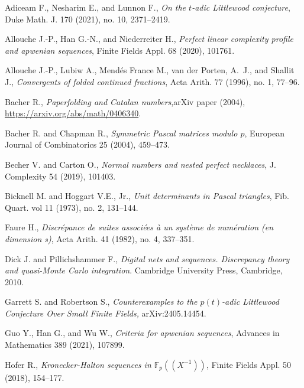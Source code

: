 \documentclass{article}
\newcommand{\FF}{\mathbb F}
\begin{document}
\begin{thebibliography}{99}

 Adiceam F., Nesharim E., and Lunnon F., \textit{On the $t$-adic Littlewood conjecture}, Duke Math. J. 170 (2021), no. 10, 2371--2419.

 Allouche J.-P., Han G.-N., and Niederreiter H., \textit{Perfect linear complexity profile and apwenian sequences}, Finite Fields Appl. 68 (2020), 101761. 

 Allouche J.-P., Lubiw A., Mend\'{e}s France M., van der Porten, A.~J., and Shallit J., \textit{Convergents of folded continued fractions}, Acta Arith. 77 (1996), no. 1, 77--96.

 Bacher R., \textit{Paperfolding and Catalan numbers},arXiv paper (2004), \url{https://arxiv.org/abs/math/0406340}. 

 Bacher R. and Chapman R., \textit{Symmetric Pascal matrices modulo $p$}, European Journal of Combinatorics 25 (2004), 459--473. 


 Becher V. and Carton O., \textit{Normal numbers and nested perfect necklaces}, J. Complexity 54 (2019), 101403.

 Bicknell M. and Hoggart V.E., Jr., \textit{Unit determinants in Pascal triangles}, Fib. Quart. vol 11 (1973), no. 2, 131--144.

 Faure H., \textit{Discr\'{e}pance de suites associ\'{e}es \`{a} un syst\`{e}me de num\'{e}ration (en dimension s)}, Acta Arith. 41 (1982), no. 4, 337--351. 

 Dick J. and Pillichshammer F., \textit{Digital nets and sequences. Discrepancy theory and quasi-Monte Carlo integration}. Cambridge University Press, Cambridge, 2010.

 Garrett S. and Robertson S., \emph{Counterexamples to the $p(t)$-adic Littlewood Conjecture Over Small Finite Fields,} arXiv:2405.14454.

 Guo Y., Han G., and Wu W., \textit{Criteria for apwenian sequences}, Advances in Mathematics 389 (2021), 107899. 

 Hofer R., \textit{Kronecker-Halton sequences in
$\FF_p((X^{-1}))$}, Finite Fields Appl. 50 (2018), 154--177. 


\end{thebibliography}
\end{document}
